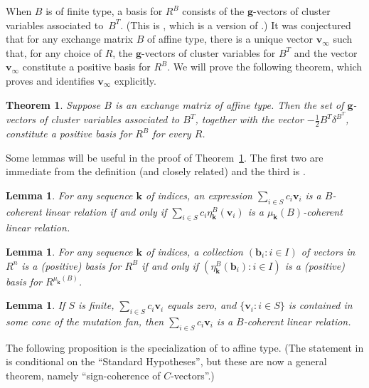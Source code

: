 \documentclass{amsart}
\newtheorem{theorem}[proposition]{Theorem}
\newtheorem{lemma}[proposition]{Lemma}
\theoremstyle{definition}
\theoremstyle{remark}
\numberwithin{equation}{section}
\newcommand{\set}[1]{{\lbrace #1 \rbrace}}
\newcommand{\0}{{\mathbf{0}}}
\newcommand{\g}{\mathbf{g}}
\renewcommand{\b}{\mathbf{b}}
\newcommand{\kk}{{\boldsymbol{k}}}
\renewcommand{\v}{\mathbf{v}}
\begin{document}
When $B$ is of finite type, a basis for $R^B$ consists of the $\g$-vectors of cluster variables associated to~$B^T$.
(This is \cite[Theorem~10.12]{universal}, which is a version of \cite[Theorem~12.4]{ca4}.)
It was conjectured \cite[Conjecture~10.15]{universal} that for any exchange matrix $B$ of affine type, there is a unique vector $\v_\infty$ such that, for any choice of $R$, the $\g$-vectors of cluster variables for $B^T$ and the vector $\v_\infty$ constitute a positive basis for $R^B$.
We will prove the following theorem, which proves \cite[Conjecture~10.15]{universal} and identifies $\v_\infty$ explicitly.

\begin{theorem}\label{uniaffine}
Suppose $B$ is an exchange matrix of affine type.
Then the set of $\g$-vectors of cluster variables associated to $B^T$, together with the vector $-\frac12B^T\delta^{B^T}$, constitute a positive basis for $R^B$ for every $R$.
\end{theorem}

Some lemmas will be useful in the proof of Theorem~\ref{uniaffine}.
The first two are immediate from the definition (and closely related) and the third is \cite[Proposition~5.9]{universal}.  

\begin{lemma}\label{I can't believe I've never written this down}
For any sequence $\kk$ of indices, an expression $\sum_{i\in S}c_i\v_i$ is a $B$-coherent linear relation if and only if $\sum_{i\in S}c_i\eta_\kk^B(\v_i)$ is a $\mu_\kk(B)$-coherent linear relation.
\end{lemma}

\begin{lemma}\label{wow, also never wrote this down}
For any sequence $\kk$ of indices, a collection $(\b_i:i\in I)$ of vectors in~$R^n$ is a (positive) basis for $R^B$ if and only if $(\eta_\kk^B(\b_i):i\in I)$ is a (positive) basis for $R^{\mu_\kk(B)}$.
\end{lemma}

\begin{lemma}\label{local coherent} 
If $S$ is finite, $\sum_{i\in S}c_i\v_i$ equals zero, and $\set{\v_i:i\in S}$ is contained in some cone of the mutation fan, then $\sum_{i\in S}c_i\v_i$ is a $B$-coherent linear relation.
\end{lemma}

The following proposition is the specialization of \cite[Proposition~10.1]{universal} to affine type.
(The statement in \cite{universal} is conditional on the ``Standard Hypotheses'', but these are now a general theorem, namely ``sign-coherence of $C$-vectors''.)
\end{document}
